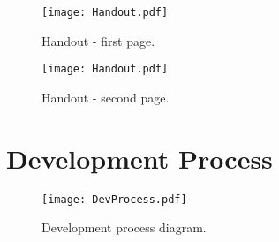 \begin{figure}[H]
\centering
\texttt{[image: Handout.pdf]}
\caption{Handout - first page.}
\end{figure}
\begin{figure}[H]
\centering
\texttt{[image: Handout.pdf]}
\caption{Handout - second page.}
\end{figure}

\section{Development Process}

\begin{figure}[H]
\centering
\texttt{[image: DevProcess.pdf]}
\caption{Development process diagram.}
\end{figure}